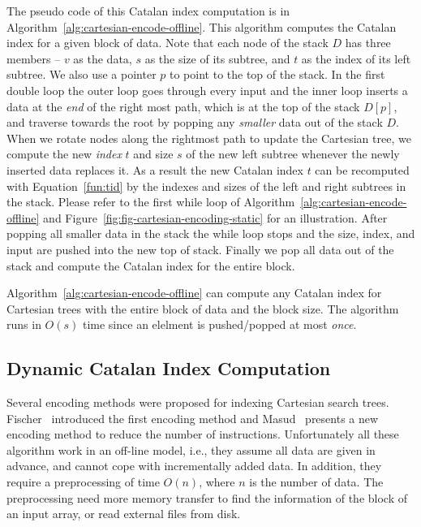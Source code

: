 The pseudo code of this Catalan index computation is in
Algorithm~\ref{alg:cartesian-encode-offline}.  This algorithm computes
the Catalan index for a given block of data.  Note that each node of
the stack $D$ has three members -- $v$ as the data, $s$ as the size of
its subtree, and $t$ as the index of its left subtree.  We also use a
pointer $p$ to point to the top of the stack.  In the first double
loop the outer loop goes through every input and the inner loop
inserts a data at the {\em end} of the right most path, which is at
the top of the stack $D[p]$, and traverse towards the root by popping
any {\em smaller} data out of the stack $D$.  When we rotate nodes
along the rightmost path to update the Cartesian tree, we compute the
new {\em index} $t$ and size $s$ of the new left subtree whenever the
newly inserted data replaces it.  As a result the new Catalan index
$t$ can be recomputed with Equation~\ref{fun:tid} by the indexes and
sizes of the left and right subtrees in the stack.  Please refer to
the first while loop of Algorithm~\ref{alg:cartesian-encode-offline}
and Figure~\ref{fig:fig-cartesian-encoding-static} for an
illustration.  After popping all smaller data in the stack the while
loop stops and the size, index, and input are pushed into the new top
of stack.  Finally we pop all data out of the stack and compute the
Catalan index for the entire block.

Algorithm~\ref{alg:cartesian-encode-offline} can compute any Catalan
index for Cartesian trees with the entire block of data and the block
size.  The algorithm runs in $O(s)$ time since an elelment is
pushed/popped at most {\em once}.



\subsection{Dynamic Catalan Index Computation}

Several encoding methods were proposed for indexing Cartesian search
trees.  Fischer~\cite{Fischer2006TheoreticalAP} introduced the first
encoding method and Masud~\cite{Hasan2010CacheOA} presents a new
encoding method to reduce the number of instructions.  Unfortunately
all these algorithm work in an off-line model, i.e., they assume all
data are given in advance, and cannot cope with incrementally added
data.  In addition, they require a preprocessing of time $O(n)$, where
$n$ is the number of data.  The preprocessing need more memory
transfer to find the information of the block of an input array, or
read external files from disk.

